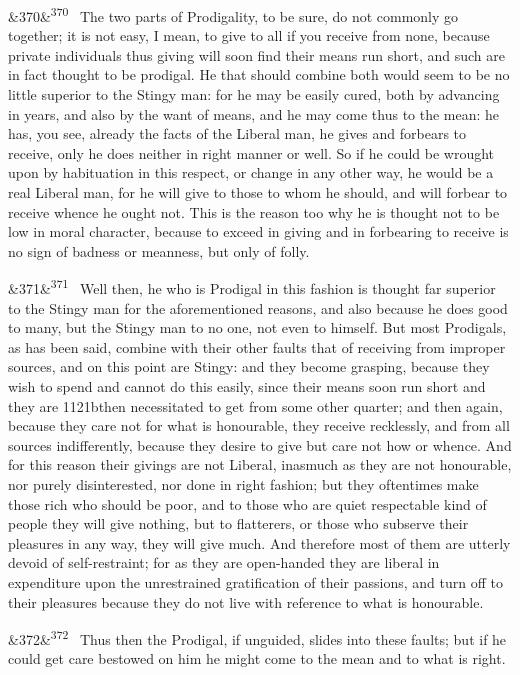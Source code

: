 \documentclass[12pt]{article}
\newcommand{\para}[1][]{\par\noindent\ifx&#1&\else\textsuperscript{\footnotesize #1}~\fi}
\begin{document}
\para[370] The two parts of Prodigality, to be sure, do not commonly go together; it is not easy, I mean, to give to all if you receive from none, because private individuals thus giving will soon find their means run short, and such are in fact thought to be prodigal. He that should combine both would seem to be no little superior to the Stingy man: for he may be easily cured, both by advancing in years, and also by the want of means, and he may come thus to the mean: he has, you see, already the facts of the Liberal man, he gives and forbears to receive, only he does neither in right manner or well. So if he could be wrought upon by habituation in this respect, or change in any other way, he would be a real Liberal man, for he will give to those to whom he should, and will forbear to receive whence he ought not. This is the reason too why he is thought not to be low in moral character, because to exceed in giving and in forbearing to receive is no sign of badness or meanness, but only of folly.

\para[371] Well then, he who is Prodigal in this fashion is thought far superior to the Stingy man for the aforementioned reasons, and also because he does good to many, but the Stingy man to no one, not even to himself. But most Prodigals, as has been said, combine with their other faults that of receiving from improper sources, and on this point are Stingy: and they become grasping, because they wish to spend and cannot do this easily, since their means soon run short and they are 1121bthen necessitated to get from some other quarter; and then again, because they care not for what is honourable, they receive recklessly, and from all sources indifferently, because they desire to give but care not how or whence. And for this reason their givings are not Liberal, inasmuch as they are not honourable, nor purely disinterested, nor done in right fashion; but they oftentimes make those rich who should be poor, and to those who are quiet respectable kind of people they will give nothing, but to flatterers, or those who subserve their pleasures in any way, they will give much. And therefore most of them are utterly devoid of self-restraint; for as they are open-handed they are liberal in expenditure upon the unrestrained gratification of their passions, and turn off to their pleasures because they do not live with reference to what is honourable.

\para[372] Thus then the Prodigal, if unguided, slides into these faults; but if he could get care bestowed on him he might come to the mean and to what is right.
\end{document}
